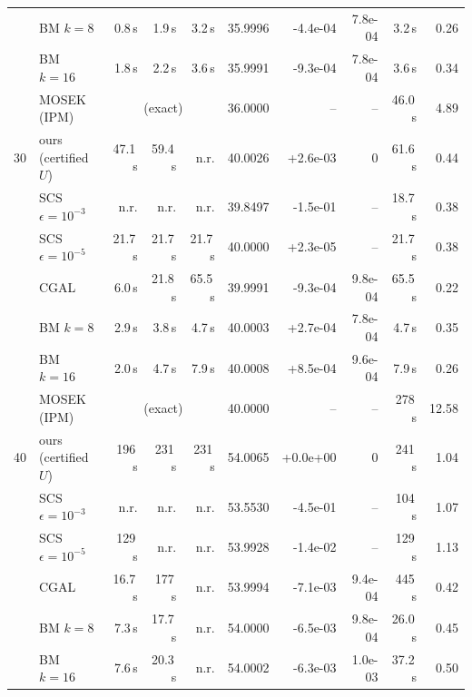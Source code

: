 \begin{tabular}{r l r r r r r r r r}
 & BM $k{=}8$ & 0.8\,s & 1.9\,s & 3.2\,s & 35.9996 & -4.4e-04 & 7.8e-04 & 3.2\,s & 0.26 \\
 & BM $k{=}16$ & 1.8\,s & 2.2\,s & 3.6\,s & 35.9991 & -9.3e-04 & 7.8e-04 & 3.6\,s & 0.34 \\
 & MOSEK (IPM) & \multicolumn{3}{c}{(exact)} & 36.0000 & -- & -- & 46.0\,s & 4.89 \\
\midrule
30 & ours (certified $U$) & 47.1\,s & 59.4\,s & n.r. & 40.0026 & +2.6e-03 & $0$ & 61.6\,s & 0.44 \\
 & SCS $\epsilon{=}10^{-3}$ & n.r. & n.r. & n.r. & 39.8497 & -1.5e-01 & -- & 18.7\,s & 0.38 \\
 & SCS $\epsilon{=}10^{-5}$ & 21.7\,s & 21.7\,s & 21.7\,s & 40.0000 & +2.3e-05 & -- & 21.7\,s & 0.38 \\
 & CGAL & 6.0\,s & 21.8\,s & 65.5\,s & 39.9991 & -9.3e-04 & 9.8e-04 & 65.5\,s & 0.22 \\
 & BM $k{=}8$ & 2.9\,s & 3.8\,s & 4.7\,s & 40.0003 & +2.7e-04 & 7.8e-04 & 4.7\,s & 0.35 \\
 & BM $k{=}16$ & 2.0\,s & 4.7\,s & 7.9\,s & 40.0008 & +8.5e-04 & 9.6e-04 & 7.9\,s & 0.26 \\
 & MOSEK (IPM) & \multicolumn{3}{c}{(exact)} & 40.0000 & -- & -- & 278\,s & 12.58 \\
\midrule
40 & ours (certified $U$) & 196\,s & 231\,s & 231\,s & 54.0065 & +0.0e+00 & $0$ & 241\,s & 1.04 \\
 & SCS $\epsilon{=}10^{-3}$ & n.r. & n.r. & n.r. & 53.5530 & -4.5e-01 & -- & 104\,s & 1.07 \\
 & SCS $\epsilon{=}10^{-5}$ & 129\,s & n.r. & n.r. & 53.9928 & -1.4e-02 & -- & 129\,s & 1.13 \\
 & CGAL & 16.7\,s & 177\,s & n.r. & 53.9994 & -7.1e-03 & 9.4e-04 & 445\,s & 0.42 \\
 & BM $k{=}8$ & 7.3\,s & 17.7\,s & n.r. & 54.0000 & -6.5e-03 & 9.8e-04 & 26.0\,s & 0.45 \\
 & BM $k{=}16$ & 7.6\,s & 20.3\,s & n.r. & 54.0002 & -6.3e-03 & 1.0e-03 & 37.2\,s & 0.50 \\
\bottomrule\end{tabular}
